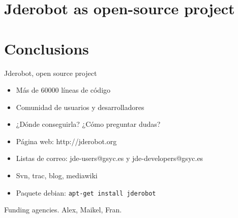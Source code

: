 \documentclass[twocolumn]{svjour3}          %
\begin{document}
\section{Jderobot as open-source project}

\section{Conclusions}

Jderobot, open source project
\begin{itemize}
\item Más de 60000 líneas de código
\item Comunidad de usuarios y desarrolladores
\item ¿Dónde conseguirla? ¿Cómo preguntar dudas? 
\item Página web: {http://jderobot.org}
\item Listas de correo: jde-users@gsyc.es y jde-developers@gsyc.es
\item Svn, trac, blog, mediawiki
\item Paquete debian: \texttt{apt-get install jderobot}
\end{itemize}

\begin{acknowledgements}
Funding agencies. Alex, Maikel, Fran.
\end{acknowledgements}

\end{document}
